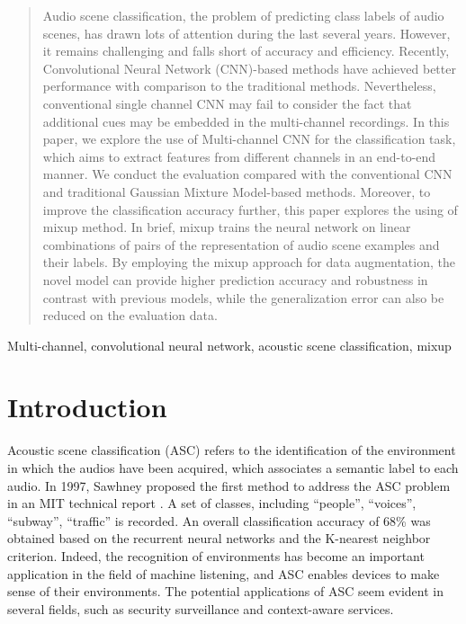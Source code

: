 \documentclass[conference]{IEEEtran}
\begin{document}
\begin{abstract}
Audio scene classification, the problem of predicting class labels of audio scenes, has drawn lots of attention during the last several years. However, it remains challenging and falls short of accuracy and efficiency. Recently, Convolutional Neural Network (CNN)-based methods have achieved better performance with comparison to the traditional methods. Nevertheless, conventional single channel CNN may fail to consider the fact that additional cues may be embedded in the multi-channel recordings. In this paper, we explore the use of Multi-channel CNN for the classification task, which aims to extract features from different channels in an end-to-end manner. We conduct the evaluation compared with the conventional CNN and traditional Gaussian Mixture Model-based methods. Moreover, to improve the classification accuracy further, this paper explores the using of mixup method. In brief, mixup trains the neural network on linear combinations of pairs of the representation of audio scene examples and their labels. By employing the mixup approach for data augmentation, the novel model can provide higher prediction accuracy and robustness in contrast with previous models, while the generalization error can also be reduced on the evaluation data.
\end{abstract}

\begin{IEEEkeywords}
Multi-channel, convolutional neural network, acoustic scene classification, mixup
\end{IEEEkeywords}

\section{Introduction}

Acoustic scene classification (ASC) refers to the identification of the environment in which the audios have been acquired, which associates a semantic label to each audio. In 1997, Sawhney proposed the first method to address the ASC problem in an MIT technical report \cite{b1}. A set of classes, including ``people'', ``voices'', ``subway'', ``traffic'' is recorded. An overall classification accuracy of 68\% was obtained based on the recurrent neural networks and the K-nearest neighbor criterion. Indeed, the recognition of environments has become an important application in the field of machine listening, and ASC enables devices to make sense of their environments. The potential applications of ASC seem evident in several fields, such as security surveillance and context-aware services.
\end{document}

